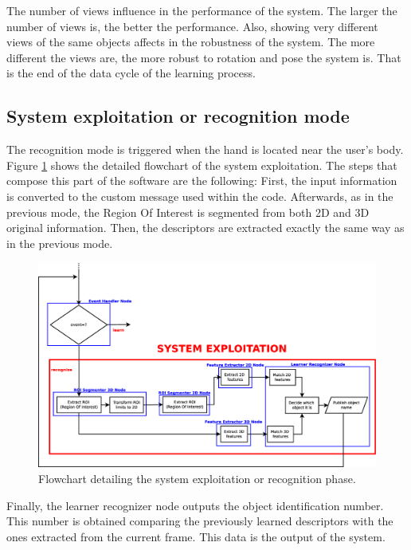 The number of views influence in the performance of the system. 
The larger the number of views is, the better the performance. 
Also, showing very different views of the same objects affects in the robustness of the system. 
The more different the views are, the more robust to rotation and pose the system is. 
That is the end of the data cycle of the learning process. 


\subsection{System exploitation or recognition mode}


The recognition mode is triggered when the hand is located near the user's body. 
Figure \ref{flowchart3} shows the detailed flowchart of the system exploitation. 
The steps that compose this part of the software are the following:
First, the input information is converted to the custom message used within the code. Afterwards, as in the previous mode, the Region Of Interest is segmented from both 2D and 3D original information. Then, the descriptors are extracted exactly the same way as in the previous mode. 
\\

\begin{figure}[H]
	\begin{center}
\includegraphics[width=\linewidth]{img/diagrams/flowchart3.eps}
	\caption[System exploitation flowchart]{Flowchart detailing the system exploitation or recognition phase.}
		\label{flowchart3}

	\end{center}
\end{figure}



Finally, the learner recognizer node outputs the object identification number. 
This number is obtained comparing the previously learned descriptors with the ones extracted from the current frame. 
This data is the output of the system. 

